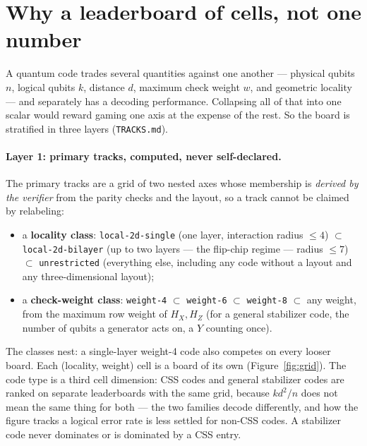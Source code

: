 \documentclass[11pt]{article}
\newcommand{\HX}{H_X}
\newcommand{\HZ}{H_Z}
\newcommand{\eff}{kd^2/n}
\begin{document}
	\section{Why a leaderboard of cells, not one number}

	A quantum code trades several quantities against one another --- physical
	qubits $n$, logical qubits $k$, distance $d$, maximum check weight $w$, and
	geometric locality --- and separately has a decoding performance.
	Collapsing all of that into one scalar would reward gaming one axis at the
	expense of the rest. So the board is stratified in three layers
	(\texttt{TRACKS.md}).

	\paragraph{Layer 1: primary tracks, computed, never self-declared.} The
	primary tracks are a grid of two nested axes whose membership is
	\emph{derived by the verifier} from the parity checks and the layout, so a
	track cannot be claimed by relabeling:
	\begin{itemize}[nosep]
		\item a \textbf{locality class}: \texttt{local-2d-single} (one layer,
		interaction radius $\le 4$) $\subset$ \texttt{local-2d-bilayer} (up to
		two layers --- the flip-chip regime --- radius $\le 7$) $\subset$
		\texttt{unrestricted} (everything else, including any code without a
		layout and any three-dimensional layout);
		\item a \textbf{check-weight class}: \texttt{weight-4} $\subset$
		\texttt{weight-6} $\subset$ \texttt{weight-8} $\subset$ any weight,
		from the maximum row weight of $\HX,\HZ$ (for a general stabilizer
		code, the number of qubits a generator acts on, a $Y$ counting once).
	\end{itemize}
	The classes nest: a single-layer weight-4 code also competes on every
	looser board. Each (locality, weight) cell is a board of its own
	(Figure~\ref{fig:grid}). The code type is a third cell dimension: CSS
	codes and general stabilizer codes are ranked on separate leaderboards
	with the same grid, because $\eff$ does not mean the same thing for
	both --- the two families decode differently, and how the figure tracks
	a logical error rate is less settled for non-CSS codes. A stabilizer
	code never dominates or is dominated by a CSS entry.
\end{document}
